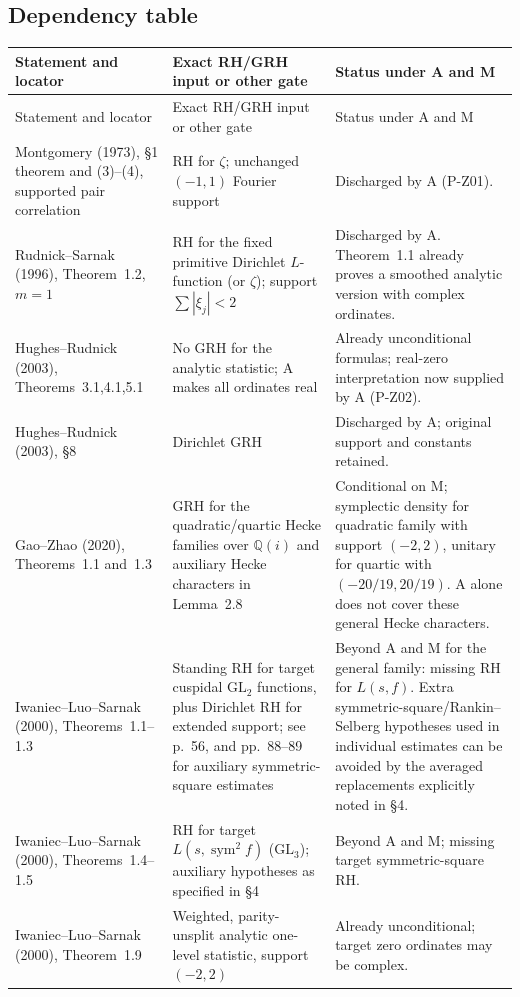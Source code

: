 \documentclass[11pt,a4paper]{article}
\theoremstyle{definition}\newtheorem{definition}{Definition}
\begin{document}
\subsection{Dependency table}
\begingroup\small
\begin{longtable}{p{}p{}p{}}
\hline
Statement and locator & Exact RH/GRH input or other gate & Status under A and M\\\hline
\endfirsthead
\hline
Statement and locator & Exact RH/GRH input or other gate & Status under A and M\\\hline
\endhead
Montgomery (1973), \S1 theorem and (3)--(4), supported pair correlation & RH for $\zeta$; unchanged $(-1,1)$ Fourier support & Discharged by A (P-Z01).\\
Rudnick--Sarnak (1996), Theorem~1.2, $m=1$ & RH for the fixed primitive Dirichlet $L$-function (or $\zeta$); support $\sum|\xi_j|<2$ & Discharged by A. Theorem~1.1 already proves a smoothed analytic version with complex ordinates.\\
Hughes--Rudnick (2003), Theorems~3.1,4.1,5.1 & No GRH for the analytic statistic; A makes all ordinates real & Already unconditional formulas; real-zero interpretation now supplied by A (P-Z02).\\
Hughes--Rudnick (2003), \S8 & Dirichlet GRH & Discharged by A; original support and constants retained.\\
Gao--Zhao (2020), Theorems~1.1 and~1.3 & GRH for the quadratic/quartic Hecke families over $\mathbb Q(i)$ and auxiliary Hecke characters in Lemma~2.8 & Conditional on M; symplectic density for quadratic family with support $(-2,2)$, unitary for quartic with $(-20/19,20/19)$. A alone does not cover these general Hecke characters.\\
Iwaniec--Luo--Sarnak (2000), Theorems~1.1--1.3 & Standing RH for target cuspidal $\mathrm{GL}_2$ functions, plus Dirichlet RH for extended support; see p.~56, and pp.~88--89 for auxiliary symmetric-square estimates & Beyond A and M for the general family: missing RH for $L(s,f)$. Extra symmetric-square/Rankin--Selberg hypotheses used in individual estimates can be avoided by the averaged replacements explicitly noted in \S4.\\
Iwaniec--Luo--Sarnak (2000), Theorems~1.4--1.5 & RH for target $L(s,\operatorname{sym}^2f)$ ($\mathrm{GL}_3$); auxiliary hypotheses as specified in \S4 & Beyond A and M; missing target symmetric-square RH.\\
Iwaniec--Luo--Sarnak (2000), Theorem~1.9 & Weighted, parity-unsplit analytic one-level statistic, support $(-2,2)$ & Already unconditional; target zero ordinates may be complex.\\

\end{longtable}
\end{document}
